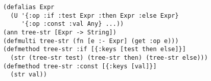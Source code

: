 \documentclass[preprint,9pt]{sigplanconf}
\theoremstyle{remark}
\theoremstyle{remark}
\begin{document}
\begin{lstlisting}
(defalias Expr
  (U '{:op :if :test Expr :then Expr :else Expr}
     '{:op :const :val Any} ...))
(ann tree-str [Expr -> String])
(defmulti tree-str (fn [e :- Expr] (get :op e)))
(defmethod tree-str :if [{:keys [test then else]}] 
  (str (tree-str test) (tree-str then) (tree-str else)))
(defmethod tree-str :const [{:keys [val]}] 
  (str val))
\end{lstlisting}




















\end{document}
